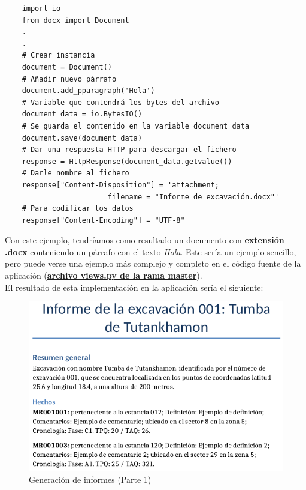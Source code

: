 \begin{verbatim}
    import io
    from docx import Document
    .
    .
    # Crear instancia
    document = Document()
    # Añadir nuevo párrafo
    document.add_pparagraph('Hola')
    # Variable que contendrá los bytes del archivo
    document_data = io.BytesIO()
    # Se guarda el contenido en la variable document_data
    document.save(document_data)
    # Dar una respuesta HTTP para descargar el fichero
    response = HttpResponse(document_data.getvalue())
    # Darle nombre al fichero
    response["Content-Disposition"] = 'attachment;
                        filename = "Informe de excavación.docx"'
    # Para codificar los datos
    response["Content-Encoding"] = "UTF-8"
\end{verbatim}

Con este ejemplo, tendríamos como resultado un documento con \textbf{extensión .docx}
conteniendo un párrafo con el texto \textit{Hola}. Este sería un ejemplo sencillo, pero
puede verse una ejemplo más complejo y completo en el código fuente de la aplicación
(\href{https://github.com/alexespana/TFG/blob/master/code/app/myFindings/views.py}
{\textbf{archivo views.py de la rama master}}). \\

El resultado de esta implementación en la aplicación sería el siguiente:

    \begin{figure}[H]
        \centering
        \includegraphics[scale=0.55]{imagenes/report-generator1.png}
        \caption{Generación de informes (Parte 1)}
        \label{fig:report-generator1}
    \end{figure}

